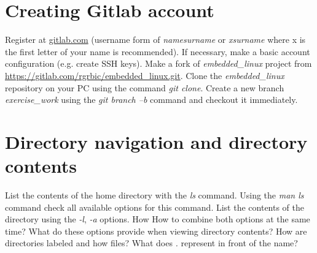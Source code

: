\documentclass[11pt]{article}
\begin{document}
\section{Creating Gitlab account}
Register at \url{gitlab.com} (username form of \textit{namesurname} or
 \textit{xsurname} where {x} is the first letter of your name is recommended).
 If necessary, make a basic account configuration (e.g. create SSH keys). Make
 a fork of \textit{embedded\_linux} project from
 \url{https://gitlab.com/rgrbic/embedded\_linux.git}.
\newline
\newline
Clone the \textit{embedded\_linux} repository on your PC using the command
 \textit{git clone}. Create a new branch \textit{exercise\_work} using the
 \textit{git branch –b} command and checkout it immediately.

\section{Directory navigation and directory contents}
List the contents of the home directory with the \textit{ls} command. Using
 the \textit{man ls} command check all available options for this command. List
 the contents of the directory using the \textit{-l}, \textit{-a} options. How
 How to combine both options at the same time? What do these options provide
 when viewing directory contents? How are directories labeled
 and how files? What does \textit{.} represent in front of the name?
\end{document}
